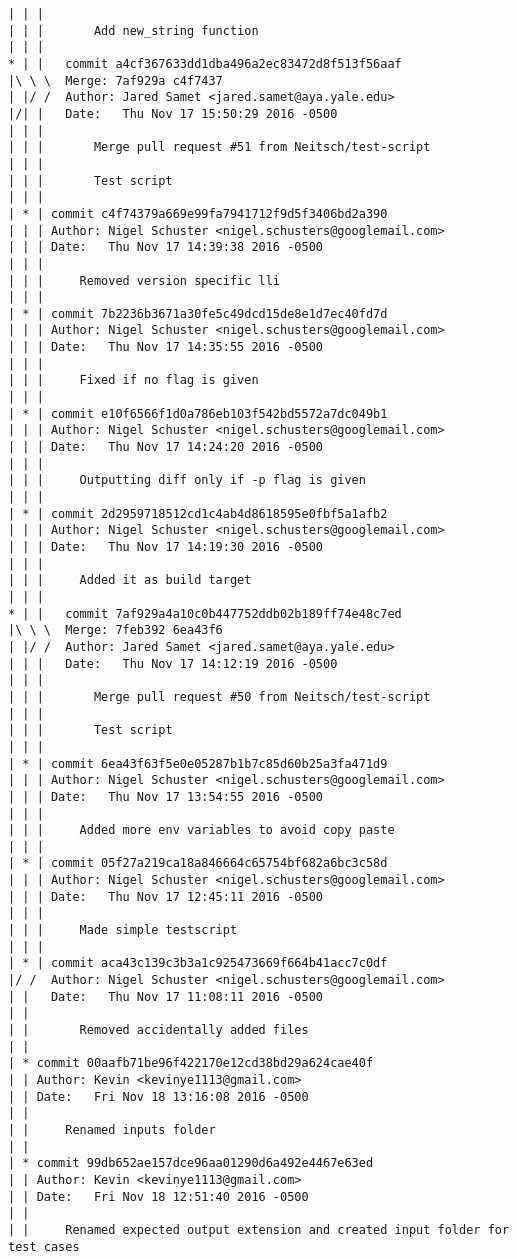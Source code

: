 \begin{lstlisting}
| | |   
| | |       Add new_string function
| | |      
* | |   commit a4cf367633dd1dba496a2ec83472d8f513f56aaf
|\ \ \  Merge: 7af929a c4f7437
| |/ /  Author: Jared Samet <jared.samet@aya.yale.edu>
|/| |   Date:   Thu Nov 17 15:50:29 2016 -0500
| | |   
| | |       Merge pull request #51 from Neitsch/test-script
| | |       
| | |       Test script
| | |    
| * | commit c4f74379a669e99fa7941712f9d5f3406bd2a390
| | | Author: Nigel Schuster <nigel.schusters@googlemail.com>
| | | Date:   Thu Nov 17 14:39:38 2016 -0500
| | | 
| | |     Removed version specific lli
| | |    
| * | commit 7b2236b3671a30fe5c49dcd15de8e1d7ec40fd7d
| | | Author: Nigel Schuster <nigel.schusters@googlemail.com>
| | | Date:   Thu Nov 17 14:35:55 2016 -0500
| | | 
| | |     Fixed if no flag is given
| | |    
| * | commit e10f6566f1d0a786eb103f542bd5572a7dc049b1
| | | Author: Nigel Schuster <nigel.schusters@googlemail.com>
| | | Date:   Thu Nov 17 14:24:20 2016 -0500
| | | 
| | |     Outputting diff only if -p flag is given
| | |    
| * | commit 2d2959718512cd1c4ab4d8618595e0fbf5a1afb2
| | | Author: Nigel Schuster <nigel.schusters@googlemail.com>
| | | Date:   Thu Nov 17 14:19:30 2016 -0500
| | | 
| | |     Added it as build target
| | |      
* | |   commit 7af929a4a10c0b447752ddb02b189ff74e48c7ed
|\ \ \  Merge: 7feb392 6ea43f6
| |/ /  Author: Jared Samet <jared.samet@aya.yale.edu>
| | |   Date:   Thu Nov 17 14:12:19 2016 -0500
| | |   
| | |       Merge pull request #50 from Neitsch/test-script
| | |       
| | |       Test script
| | |    
| * | commit 6ea43f63f5e0e05287b1b7c85d60b25a3fa471d9
| | | Author: Nigel Schuster <nigel.schusters@googlemail.com>
| | | Date:   Thu Nov 17 13:54:55 2016 -0500
| | | 
| | |     Added more env variables to avoid copy paste
| | |    
| * | commit 05f27a219ca18a846664c65754bf682a6bc3c58d
| | | Author: Nigel Schuster <nigel.schusters@googlemail.com>
| | | Date:   Thu Nov 17 12:45:11 2016 -0500
| | | 
| | |     Made simple testscript
| | |    
| * | commit aca43c139c3b3a1c925473669f664b41acc7c0df
|/ /  Author: Nigel Schuster <nigel.schusters@googlemail.com>
| |   Date:   Thu Nov 17 11:08:11 2016 -0500
| |   
| |       Removed accidentally added files
| |   
| * commit 00aafb71be96f422170e12cd38bd29a624cae40f
| | Author: Kevin <kevinye1113@gmail.com>
| | Date:   Fri Nov 18 13:16:08 2016 -0500
| | 
| |     Renamed inputs folder
| |   
| * commit 99db652ae157dce96aa01290d6a492e4467e63ed
| | Author: Kevin <kevinye1113@gmail.com>
| | Date:   Fri Nov 18 12:51:40 2016 -0500
| | 
| |     Renamed expected output extension and created input folder for test cases

\end{lstlisting}
